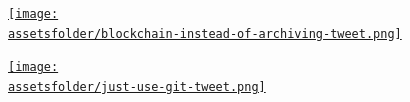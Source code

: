 \documentclass{beamer}
\newcommand{\assetsfolder}{./assets}
\begin{document}
    \begin{frame}
        \begin{center}
            \href{https://twitter.com/JamesCampbell95/status/996419422951825410}{\texttt{[image: \\assetsfolder/blockchain-instead-of-archiving-tweet.png]}}
        \end{center}

    \end{frame}

    \begin{frame}
        \begin{center}
            \href{https://twitter.com/legogradstudent/status/979776951517876225}{\texttt{[image: \\assetsfolder/just-use-git-tweet.png]}}
        \end{center}

    \end{frame}

	\begin{frame}
		\begin{center}
		\end{center}

	\end{frame}
\end{document}
